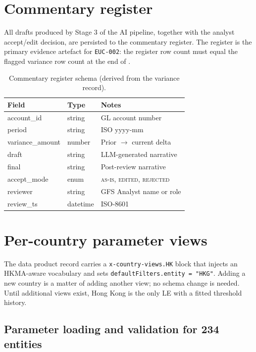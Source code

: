 \section{Commentary register}

All drafts produced by Stage 3 of the AI pipeline, together with the
analyst accept/edit decision, are persisted to the commentary
register. The register is the primary evidence artefact for
\texttt{EUC-002}: the register row count must equal the flagged
variance row count at the end of .

\begin{table}[htbp]
\caption{Commentary register schema (derived from the variance
record).}\label{tab:commentary-register}
\centering
\small
\begin{tabularx}{\linewidth}{@{}llX@{}}
\toprule
\textbf{Field} & \textbf{Type} & \textbf{Notes} \\ \midrule
account\_id      & string  & GL account number \\
period           & string  & ISO yyyy-mm \\
variance\_amount & number  & Prior $\to$ current delta \\
draft            & string  & LLM-generated narrative \\
final            & string  & Post-review narrative \\
accept\_mode     & enum    & \textsc{as-is}, \textsc{edited}, \textsc{rejected} \\
reviewer         & string  & GFS Analyst name or role \\
review\_ts       & datetime & ISO-8601 \\
\bottomrule
\end{tabularx}
\end{table}

\section{Per-country parameter views}\label{sec:per-country-views}

The data product record carries a \texttt{x-country-views.HK} block
that injects an HKMA-aware vocabulary and sets
\texttt{defaultFilters.entity = "HKG"}. Adding a new country is a
matter of adding another view; no schema change is needed. Until
additional views exist, Hong Kong is the only LE with a fitted
threshold history.

\subsection{Parameter loading and validation for 234 entities}
\label{sec:params-234}

